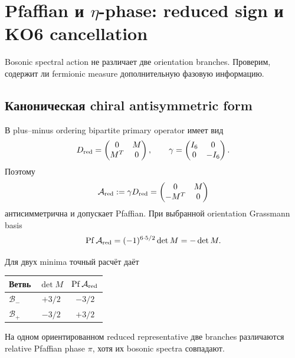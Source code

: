 \chapter{Pfaffian и \texorpdfstring{\(\eta\)}{eta}-phase: reduced sign и KO6 cancellation}

Bosonic spectral action не различает две orientation branches. Проверим,
содержит ли fermionic measure дополнительную фазовую информацию.

\section{Каноническая chiral antisymmetric form}

В plus--minus ordering bipartite primary operator имеет вид
\begin{equation}
 D_{\rm red}=
 \begin{pmatrix}
 0&M\\
 M^T&0
 \end{pmatrix},
 \qquad
 \gamma=
 \begin{pmatrix}
 I_6&0\\0&-I_6
 \end{pmatrix}.
\end{equation}
Поэтому
\begin{equation}
 \mathcal A_{\rm red}:=\gamma D_{\rm red}
 =
 \begin{pmatrix}
 0&M\\
 -M^T&0
 \end{pmatrix}
\end{equation}
антисимметрична и допускает Pfaffian. При выбранной orientation Grassmann
basis
\begin{equation}
 \operatorname{Pf}\mathcal A_{\rm red}
 =
 (-1)^{6\cdot5/2}\det M
 =-\det M.
\end{equation}

Для двух minima точный расчёт даёт
\begin{center}
\begin{tabular}{lcc}
\toprule
Ветвь & \(\det M\) & \(\operatorname{Pf}\mathcal A_{\rm red}\)\\
\midrule
\(\mathcal B_-\) & \(+3/2\) & \(-3/2\)\\
\(\mathcal B_+\) & \(-3/2\) & \(+3/2\)\\
\bottomrule
\end{tabular}
\end{center}

\begin{proposition}
На одном ориентированном reduced representative две branches различаются
relative Pfaffian phase \(\pi\), хотя их bosonic spectra совпадают.
\end{proposition}

